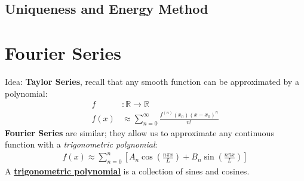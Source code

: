\documentclass[11pt]{scrartcl}
\theoremstyle{definition}
\theoremstyle{remark}
\newcommand{\dfn}[1]{\textbf{\underline{#1}}}
\newcommand{\R}[0]{\mathbb{R}}
\begin{document}
\subsection{Uniqueness and Energy Method}


\section{Fourier Series}
Idea: \textbf{Taylor Series}, recall that any smooth function can be approximated by a polynomial:
\begin{align*}
	f &: \R \rightarrow \R \\
	f(x) & \approx \sum_{n=0}^\infty \frac{f^{(n)} (x_0)(x-x_0)^n}{n!}
\end{align*}
\textbf{Fourier Series} are similar; they allow us to approximate any continuous function with a \emph{trigonometric polynomial}:
\begin{align}
	f(x) \approx \sum_{n=0}^n \left[ A_n \cos \left( \frac{n \pi x}{L} \right) + B_n \sin \left( \frac{n \pi x}{L} \right) \right] 	
\end{align}
A \dfn{trigonometric polynomial} is a collection of sines and cosines. 
\end{document}

